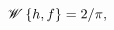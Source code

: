 $\mathop{\mathscr{W}\/}\nolimits\left\{\mathop{h\/}\nolimits,\mathop{f\/}%
\nolimits\right\}=2/\pi,$